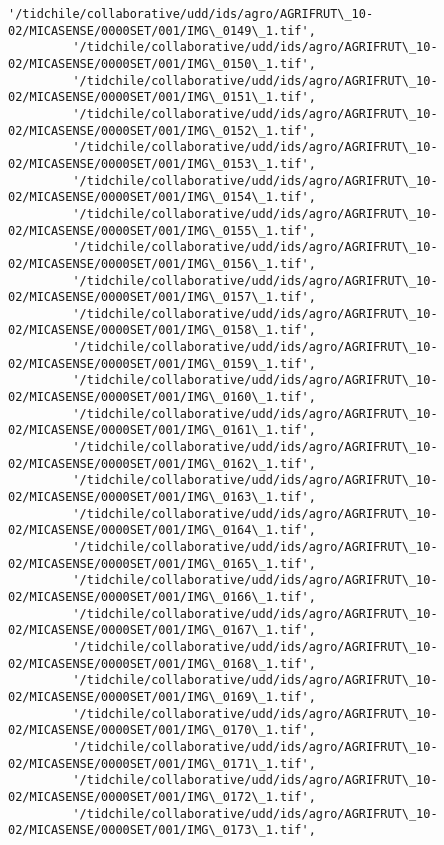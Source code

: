 \documentclass[11pt]{article}
\begin{document}
\begin{Verbatim}[commandchars=\\\{\}]
         '/tidchile/collaborative/udd/ids/agro/AGRIFRUT\_10-02/MICASENSE/0000SET/001/IMG\_0149\_1.tif',
         '/tidchile/collaborative/udd/ids/agro/AGRIFRUT\_10-02/MICASENSE/0000SET/001/IMG\_0150\_1.tif',
         '/tidchile/collaborative/udd/ids/agro/AGRIFRUT\_10-02/MICASENSE/0000SET/001/IMG\_0151\_1.tif',
         '/tidchile/collaborative/udd/ids/agro/AGRIFRUT\_10-02/MICASENSE/0000SET/001/IMG\_0152\_1.tif',
         '/tidchile/collaborative/udd/ids/agro/AGRIFRUT\_10-02/MICASENSE/0000SET/001/IMG\_0153\_1.tif',
         '/tidchile/collaborative/udd/ids/agro/AGRIFRUT\_10-02/MICASENSE/0000SET/001/IMG\_0154\_1.tif',
         '/tidchile/collaborative/udd/ids/agro/AGRIFRUT\_10-02/MICASENSE/0000SET/001/IMG\_0155\_1.tif',
         '/tidchile/collaborative/udd/ids/agro/AGRIFRUT\_10-02/MICASENSE/0000SET/001/IMG\_0156\_1.tif',
         '/tidchile/collaborative/udd/ids/agro/AGRIFRUT\_10-02/MICASENSE/0000SET/001/IMG\_0157\_1.tif',
         '/tidchile/collaborative/udd/ids/agro/AGRIFRUT\_10-02/MICASENSE/0000SET/001/IMG\_0158\_1.tif',
         '/tidchile/collaborative/udd/ids/agro/AGRIFRUT\_10-02/MICASENSE/0000SET/001/IMG\_0159\_1.tif',
         '/tidchile/collaborative/udd/ids/agro/AGRIFRUT\_10-02/MICASENSE/0000SET/001/IMG\_0160\_1.tif',
         '/tidchile/collaborative/udd/ids/agro/AGRIFRUT\_10-02/MICASENSE/0000SET/001/IMG\_0161\_1.tif',
         '/tidchile/collaborative/udd/ids/agro/AGRIFRUT\_10-02/MICASENSE/0000SET/001/IMG\_0162\_1.tif',
         '/tidchile/collaborative/udd/ids/agro/AGRIFRUT\_10-02/MICASENSE/0000SET/001/IMG\_0163\_1.tif',
         '/tidchile/collaborative/udd/ids/agro/AGRIFRUT\_10-02/MICASENSE/0000SET/001/IMG\_0164\_1.tif',
         '/tidchile/collaborative/udd/ids/agro/AGRIFRUT\_10-02/MICASENSE/0000SET/001/IMG\_0165\_1.tif',
         '/tidchile/collaborative/udd/ids/agro/AGRIFRUT\_10-02/MICASENSE/0000SET/001/IMG\_0166\_1.tif',
         '/tidchile/collaborative/udd/ids/agro/AGRIFRUT\_10-02/MICASENSE/0000SET/001/IMG\_0167\_1.tif',
         '/tidchile/collaborative/udd/ids/agro/AGRIFRUT\_10-02/MICASENSE/0000SET/001/IMG\_0168\_1.tif',
         '/tidchile/collaborative/udd/ids/agro/AGRIFRUT\_10-02/MICASENSE/0000SET/001/IMG\_0169\_1.tif',
         '/tidchile/collaborative/udd/ids/agro/AGRIFRUT\_10-02/MICASENSE/0000SET/001/IMG\_0170\_1.tif',
         '/tidchile/collaborative/udd/ids/agro/AGRIFRUT\_10-02/MICASENSE/0000SET/001/IMG\_0171\_1.tif',
         '/tidchile/collaborative/udd/ids/agro/AGRIFRUT\_10-02/MICASENSE/0000SET/001/IMG\_0172\_1.tif',
         '/tidchile/collaborative/udd/ids/agro/AGRIFRUT\_10-02/MICASENSE/0000SET/001/IMG\_0173\_1.tif',

\end{Verbatim}
\end{document}
